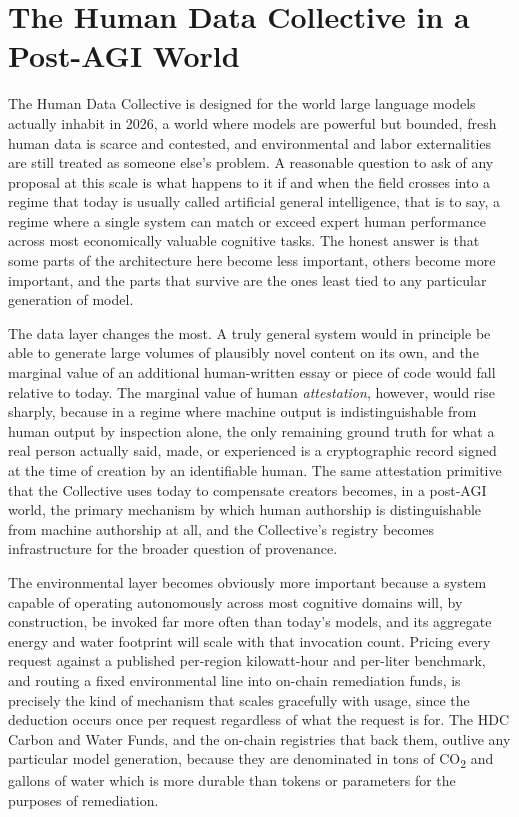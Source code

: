 \documentclass[10pt,a4paper,twocolumn]{article}
\begin{document}
\section{The Human Data Collective in a Post-AGI World}
\label{sec:appendix-postagi}

The Human Data Collective is designed for the world large language models actually inhabit in 2026, a world where models are powerful but bounded, fresh human data is scarce and contested, and environmental and labor externalities are still treated as someone else's problem. A reasonable question to ask of any proposal at this scale is what happens to it if and when the field crosses into a regime that today is usually called artificial general intelligence, that is to say, a regime where a single system can match or exceed expert human performance across most economically valuable cognitive tasks. The honest answer is that some parts of the architecture here become less important, others become more important, and the parts that survive are the ones least tied to any particular generation of model.

The data layer changes the most. A truly general system would in principle be able to generate large volumes of plausibly novel content on its own, and the marginal value of an additional human-written essay or piece of code would fall relative to today. The marginal value of human \emph{attestation}, however, would rise sharply, because in a regime where machine output is indistinguishable from human output by inspection alone, the only remaining ground truth for what a real person actually said, made, or experienced is a cryptographic record signed at the time of creation by an identifiable human. The same attestation primitive that the Collective uses today to compensate creators becomes, in a post-AGI world, the primary mechanism by which human authorship is distinguishable from machine authorship at all, and the Collective's registry becomes infrastructure for the broader question of provenance.

The environmental layer becomes obviously more important because a system capable of operating autonomously across most cognitive domains will, by construction, be invoked far more often than today's models, and its aggregate energy and water footprint will scale with that invocation count. Pricing every request against a published per-region kilowatt-hour and per-liter benchmark, and routing a fixed environmental line into on-chain remediation funds, is precisely the kind of mechanism that scales gracefully with usage, since the deduction occurs once per request regardless of what the request is for. The HDC Carbon and Water Funds, and the on-chain registries that back them, outlive any particular model generation, because they are denominated in tons of CO\textsubscript{2} and gallons of water which is more durable than tokens or parameters for the purposes of remediation.
\end{document}
